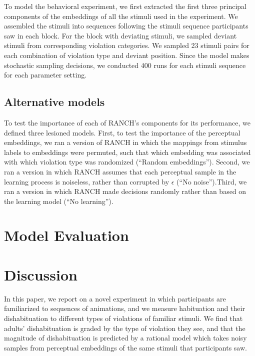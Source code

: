 \documentclass[10pt, letterpaper]{article}
\begin{document}
To model the behavioral experiment, we first extracted the first three
principal components of the embeddings of all the stimuli used in the
experiment. We assembled the stimuli into sequences following the
stimuli sequence participants saw in each block. For the block with
deviating stimuli, we sampled deviant stimuli from corresponding
violation categories. We sampled 23 stimuli pairs for each combination
of violation type and deviant position. Since the model makes stochastic
sampling decisions, we conducted 400 runs for each stimuli sequence for
each parameter setting.

\hypertarget{alternative-models}{%
\subsection{Alternative models}\label{alternative-models}}

To test the importance of each of RANCH's components for its
performance, we defined three lesioned models. First, to test the
importance of the perceptual embeddings, we ran a version of RANCH in
which the mappings from stimulus labels to embeddings were permuted,
such that which embedding was associated with which violation type was
randomized (``Random embeddings''). Second, we ran a version in which
RANCH assumes that each perceptual sample in the learning process is
noiseless, rather than corrupted by \(\epsilon\) (``No noise'').Third,
we ran a version in which RANCH made decisions randomly rather than
based on the learning model (``No learning'').

\hypertarget{model-evaluation}{%
\section{Model Evaluation}\label{model-evaluation}}

\hypertarget{discussion}{%
\section{Discussion}\label{discussion}}

In this paper, we report on a novel experiment in which participants are
familiarized to sequences of animations, and we measure habituation and
their dishabituation to different types of violations of familiar
stimuli. We find that adults' dishabituation is graded by the type of
violation they see, and that the magnitude of dishabituation is
predicted by a rational model which takes noisy samples from perceptual
embeddings of the same stimuli that participants saw.
\end{document}
